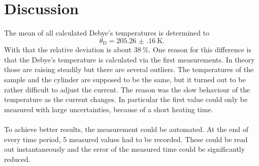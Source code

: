 \section{Discussion}
\label{sec:Diskussion}

The mean of all calculated Debye's temperatures is determined to
\begin{equation}
    \theta_\text{D} = \qty{205.26(16)}{\kelvin}.
\end{equation}
With that the relative deviation is about $\qty{38}{\percent}$.
One reason for this difference is that the Debye's temperature is calculated via the first measurements.
In theory those are raising steadily but there are several outliers. 
The temperatures of the sample and the cylinder are supposed to be the same, but it turned out to be rather difficult to adjust the current.
The reason was the slow behaviour of the temperature as the current changes.
In particular the first value could only be measured with large uncertainties, because of a short heating time.
\\
\\
To achieve better results, the measurement could be automated. 
At the end of every time period, 5 measured values had to be recorded. 
These could be read out instantaneously and the error of the measured time could be significantly reduced.